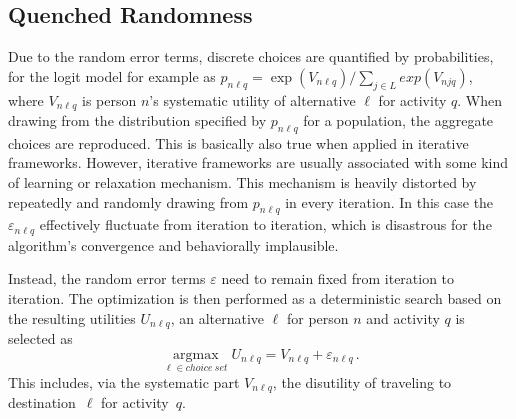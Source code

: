 \subsection{Quenched Randomness}
Due to the random error terms, discrete choices are quantified by probabilities, for the logit model for example as $p_{n\ell q} = \exp(V_{n\ell q}) / \sum_{j \in L} exp(V_{njq})$, where $V_{n\ell q}$ is person $n$'s systematic utility of alternative $\ell$ for activity $q$. 
When drawing from the distribution specified by $p_{n\ell 
  q}$ for a population, the aggregate choices are reproduced. 
This is basically also true when applied in iterative frameworks. 
However, iterative frameworks are usually associated with some kind of learning or relaxation mechanism. 
This mechanism is heavily distorted by repeatedly and randomly drawing from $p_{n\ell q}$ in every iteration. 
In this case the $\varepsilon_{n\ell q}$ effectively fluctuate from iteration to iteration, which is disastrous for the algorithm's convergence and behaviorally implausible.

Instead, the random error terms $\varepsilon$ need to remain fixed from iteration to iteration. 
The optimization is then performed as a deterministic search based on the resulting utilities $U_{n\ell q}$, \ie an alternative $\ell$ for person $n$ and activity $q$ is selected as 
\[ 
\underset{\ell \in choice\: set}{\operatorname{argmax}} U_{n \ell q} = V_{n \ell q} + \varepsilon_{n \ell q} \,.
\] 
This includes, via the systematic part $V_{n\ell q}$, the disutility of traveling to destination~$\ell$ for activity~$q$.

